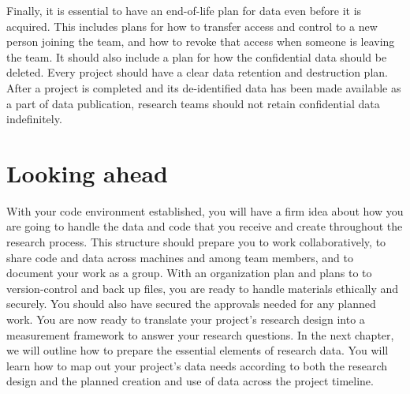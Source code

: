 Finally, it is essential to have an end-of-life plan for data even before it is acquired.
This includes plans for how to transfer access and control to a new person joining the team,
and how to revoke that access when someone is leaving the team.
It should also include a plan for how the confidential data should be deleted.
Every project should have a clear data retention and destruction plan.
After a project is completed and its
de-identified data has been made available as a part of data publication,
research teams should not retain confidential data indefinitely.

\section{Looking ahead}
With your code environment established,
you will have a firm idea about how you are going to
handle the data and code that
you receive and create throughout the research process.
This structure should prepare you to work collaboratively,
to share code and data across machines and among team members,
and to document your work as a group.
With an organization plan
and plans to to version-control and back up files,
you are ready to handle materials ethically and securely.
You should also have secured the approvals needed for any planned work.
You are now ready to translate your project's research design into a measurement framework
to answer your research questions.
In the next chapter,
we will outline how to prepare the essential elements of research data.
You will learn how to map out your project's data needs
according to both the research design
and the planned creation and use of data across the project timeline.
